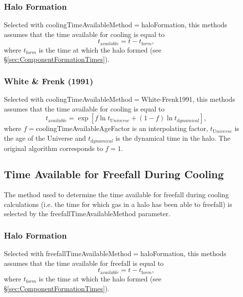 \subsubsection{Halo Formation}

Selected with {\normalfont \ttfamily coolingTimeAvailableMethod}$=${\normalfont \ttfamily haloFormation}, this methods assumes that the time available for cooling is equal to
\begin{equation}
 t_{\mathrm available} = t - t_{\mathrm form},
\end{equation}
where $t_{\mathrm form}$ is the time at which the halo formed (see \S\ref{sec:ComponentFormationTimes}).

\subsubsection{White \& Frenk (1991)}

Selected with {\normalfont \ttfamily coolingTimeAvailableMethod}$=${\normalfont \ttfamily White-Frenk1991}, this methods assumes that the time available for cooling is equal to
\begin{equation}
 t_{\mathrm available} = \exp\left[ f \ln t_{\mathrm Universe} + (1-f)\ln t_{\mathrm dynamical} \right],
\end{equation}
where $f=${\normalfont \ttfamily coolingTimeAvailableAgeFactor} is an interpolating factor, $t_{\mathrm Universe}$ is the age of the Universe and $t_{\mathrm dynamical}$ is the dynamical time in the halo. The original \cite{white_galaxy_1991} algorithm corresponds to $f=1$.


\subsection{Time Available for Freefall During Cooling}\label{sec:TimeAvailableFreefall}

The method used to determine the time available for freefall during cooling calculations (i.e. the time for which gas in a halo has been able to freefall) is selected by the {\normalfont \ttfamily freefallTimeAvailableMethod} parameter.

\subsubsection{Halo Formation}

Selected with {\normalfont \ttfamily freefallTimeAvailableMethod}$=${\normalfont \ttfamily haloFormation}, this methods assumes that the time available for freefall is equal to
\begin{equation}
 t_{\mathrm available} = t - t_{\mathrm form},
\end{equation}
where $t_{\mathrm form}$ is the time at which the halo formed (see \S\ref{sec:ComponentFormationTimes}).

